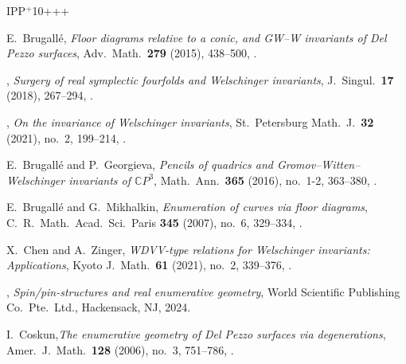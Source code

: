 \documentclass[11pt]{amsart}
\numberwithin{equation}{section}
\theoremstyle{definition}
\theoremstyle{plain}
\theoremstyle{remark}
\newcommand{\R}{\mathbb{R}}
\newcommand{\ssrp}{\mathbb{S}^2\times \mathbb{R}P^1}
\begin{document}
\begin{table}[H]
\caption{Genus $0$ Welschinger invariants $W_{\mathbb{S}^2\times \R P^1}^{\mathfrak{s}_{\mathbb{S}^2\times \R P^1},\mathfrak{o}_{\mathbb{S}^2\times \R P^1}}((a;c),l)$ of real $3$-dimensional del Pezzo varieties of degree $6$, whose real part is $\ssrp$,  using Formula (\ref{Eq:W.in.deg.6.2}) with $a \leq 5$.} 
\label{Tab:W.in.deg.6.2}
\end{table}


 
\newcommand{\etalchar}[1]{$^{#1}$}

\begin{thebibliography}{IPP{\etalchar{+}}10+++}

E.~Brugall{\'e}, \emph{Floor diagrams relative to a conic, and {GW}--{W}
  invariants of {D}el {P}ezzo surfaces}, Adv.\ Math.\ \textbf{279}
  (2015), 438--500, .

\bysame, \emph{Surgery of real symplectic fourfolds and {W}elschinger
  invariants}, J.~Singul.\ \textbf{17} (2018), 267--294,
.

  \bysame, \emph{On the invariance of {W}elschinger invariants},
  St.\ Petersburg Math.~J.\ \textbf{32} (2021), no.~2, 199--214,
.

E.~Brugall{\'e} and P.~Georgieva, \emph{Pencils of quadrics and
  {G}romov--{W}itten--{W}elschinger invariants of $\mathbb{C} {P}^3$},
  Math.\ Ann.\ \textbf{365} (2016), no.~1-2, 363--380,
.

E.~Brugall{\'e} and G.~Mikhalkin, \emph{Enumeration of curves via floor
  diagrams}, C.~R.~Math.\ Acad.\ Sci.\ Paris \textbf{345} (2007), no.~6, 329--334,
.

X.~Chen and A.~Zinger, \emph{WDVV-type relations for {W}elschinger
  invariants: {A}pplications}, Kyoto J.~Math.\ \textbf{61} (2021),
  no.~2, 339--376, .

\bysame, \emph{Spin/pin-structures and real enumerative geometry}, World
  Scientific Publishing Co.\ Pte.\ Ltd., Hackensack, NJ, 2024.

  I.~Coskun,\emph{The enumerative geometry of Del Pezzo surfaces via degenerations}, Amer.~J.\ Math.\ \textbf{128} (2006), no.~3, 751--786, .


\end{thebibliography}
\end{document}
